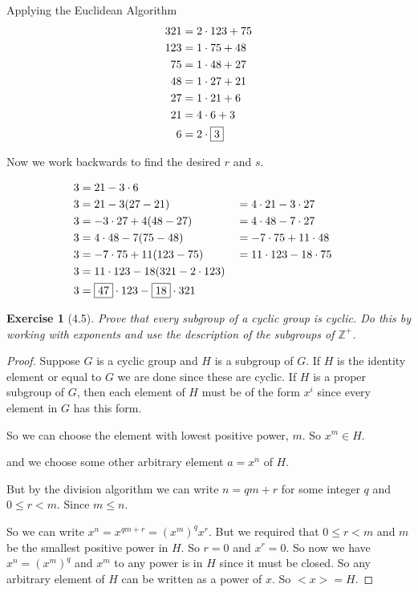 \documentclass[12pt,leqno]{article}
\numberwithin{equation}{section}
\newtheorem*{exer}{Exercise}
\theoremstyle{definition}
\begin{document}
Applying the Euclidean Algorithm
\begin{align*}
    321 &= 2 \cdot 123 + 75 \\
    123 &= 1 \cdot 75 + 48  \\
    75 &= 1 \cdot 48 + 27   \\
    48 &= 1 \cdot 27 + 21   \\
    27 &= 1 \cdot 21 + 6    \\
    21 &= 4 \cdot 6 + 3 \\
    6 &= 2 \cdot \framebox{3}
\end{align*}

Now we work backwards to find the desired $r$ and $s$.

\begin{alignat*}{2}
    3 &= 21 - 3 \cdot 6 \\
    3 &= 21 - 3(27 - 21) & &= 4 \cdot 21 - 3 \cdot 27 \\
    3 &= -3 \cdot 27 + 4(48 - 27) & &= 4 \cdot 48 - 7 \cdot 27    \\
    3 &= 4 \cdot 48 - 7(75 - 48) & &= -7 \cdot 75 + 11 \cdot 48    \\
    3 &= -7 \cdot 75 + 11(123 - 75) & &= 11 \cdot 123 - 18 \cdot 75   \\
    3 &= 11 \cdot 123 - 18 (321 - 2 \cdot 123)  \\
    3 &= \framebox{47} \cdot 123 - \framebox{18} \cdot 321
\end{alignat*}

\begin{exer}[4.5]
Prove that every subgroup of a cyclic group is cyclic. Do this by working with exponents and use the description of the subgroups of $\mathbb Z^{+}$.
\end{exer}

\begin{proof}[Proof]

    Suppose $G$ is a cyclic group and $H$ is a subgroup of $G$. If $H$ is the
    identity element or equal to $G$ we are done since these are cyclic. If $H$
    is a proper subgroup of $G$, then each element of $H$ must be of the form
    $x^i$ since every element in $G$ has this form. 

    So we can choose the element with lowest positive power, $m$. So $x^m \in
    H$.

    and we choose some other arbitrary element $a = x^n$ of $H$. 

    But by the division algorithm we can write $n = qm + r$ for some integer
    $q$ and $0 \le r < m$. Since $m \le n$.

    So we can write $x^n = x^{qm + r} = (x^m)^q x^r$. But we required that $0
    \le r < m$ and $m$ be the smallest positive power in $H$. So $r = 0$ and
    $x^r = 0$.  So now we have $x^n = (x^m)^q$ and $x^m$ to any power is in $H$
    since it must be closed. So any arbitrary element of $H$ can be written as
    a power of $x$. So $<x> = H$.

\end{proof}
\end{document}

